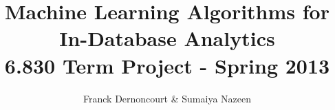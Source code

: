 \documentclass[10pt]{article}
\begin{document}
\title{Machine Learning Algorithms for In-Database Analytics \\ \small{6.830 Term Project - Spring 2013}}
\author{Franck Dernoncourt \& Sumaiya Nazeen}
\maketitle 


 
 





 
\end{document}
